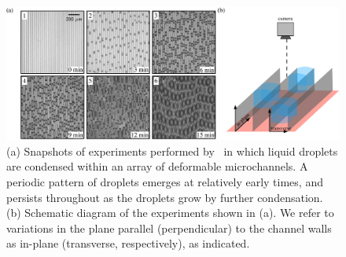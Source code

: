 \documentclass{jfm}
\begin{document}
\begin{figure}
    \centering
    \includegraphics[width = \textwidth]{figures/BrinkmannExperiments.pdf}
    \caption{(a) Snapshots of experiments performed by~\cite{Seemann2011JPhysCondMat} in which liquid droplets are condensed within an array of deformable microchannels. A periodic pattern of droplets emerges at relatively early times, and persists throughout as the droplets grow by further condensation. (b) Schematic diagram of the experiments shown in (a). We refer to variations in the plane parallel (perpendicular) to the channel walls as in-plane (transverse, respectively), as indicated.}
    \label{fig:Experiments}
\end{figure}
\end{document}
